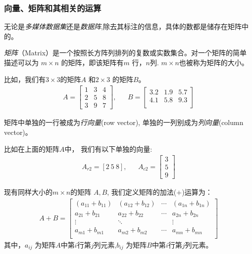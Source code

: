 \documentclass[12pt]{article}
\numberwithin{figure}{section}
\numberwithin{equation}{section}
\begin{document}
\subsubsection{向量、矩阵和其相关的运算}

无论是\textit{多媒体数据集}还是\textit{数据阵},除去其标注的信息，具体的数都是储存在矩阵中的。

\begin{definition}
	\textit{矩阵}（Matrix）是一个按照长方阵列排列的复数或实数集合。对一个矩阵的简单描述可以为 $m \times n$ 的矩阵，即该矩阵有$m$ 行，$n$列. $m \times n$也被称为矩阵的大小。
\end{definition}
\begin{example}
比如，我们有$3 \times 3 $的矩阵$A$ 和$2 \times 3$ 的矩阵$B$。
\begin{align*}
	 A = \begin{bmatrix}
	1 & 3 & 4 \\
	2 & 5 & 8 \\
	3 & 9 & 7
\end{bmatrix}, & & B = \begin{bmatrix}
	3.2 & 1.9 & 5.7 \\
	4.1 & 5.8 & 9.3 \\
\end{bmatrix}
\end{align*}	
\end{example}

\begin{definition}
	矩阵中单独的一行被成为\textit{行向量}(row vector), 单独的一列别成为\textit{列向量}(column vector)。
\end{definition}
\begin{example}
比如在上面的矩阵$A$中，	我们有以下单独的向量:
\begin{align*}
	A_{r2} = [2 \ 5 \ 8],  & & A_{c2} = \begin{bmatrix}
		3 \\
		5 \\
		9 
	\end{bmatrix}
\end{align*}
\end{example}

\begin{definition}
	现有同样大小的$m \times n$的矩阵 $A, B$, 我们定义矩阵的加法($+$)运算为：
	\begin{align*}
		A + B = \begin{bmatrix}
			(a_{11} + b_{11}) & (a_{12}+b_{12}) & \cdots & (a_{1n}+b_{1n}) \\
			a_{21} + b_{21} & a_{22}+b_{22} & \cdots & a_{2n}+b_{2n} \\
			\vdots & \ddots & & \vdots \\
			a_{m1} + b_{m1} & a_{m2}+b_{m2} & \cdots & a_{mn}+b_{mn} \\
		\end{bmatrix}
	\end{align*}
	其中，$a_{ij}$ 为矩阵$A$中第$i$行第$j$列元素,$b_{ij}$ 为矩阵$B$中第$i$行第$j$列元素。
\end{definition}
\end{document}
